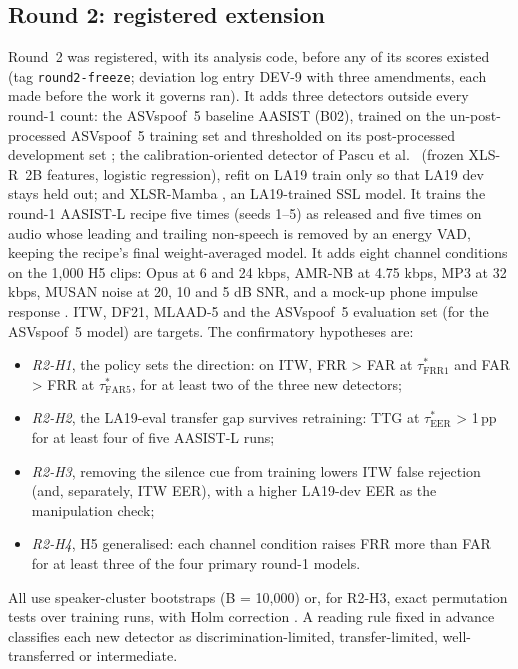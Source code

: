 \documentclass[journal]{IEEEtran}
\newcommand{\tauE}{\tau^{*}_{\mathrm{EER}}}
\newcommand{\tauF}[1]{\tau^{*}_{\mathrm{FRR}#1}}
\newcommand{\tauA}[1]{\tau^{*}_{\mathrm{FAR}#1}}
\begin{document}
\subsection{Round 2: registered extension}
Round~2 was registered, with its analysis code, before any of its scores existed (tag \texttt{round2-freeze}; deviation log
entry DEV-9 with three amendments, each made before the work it governs ran). It adds three detectors outside every round-1
count: the ASVspoof~5 baseline AASIST (B02), trained on the un-post-processed ASVspoof~5 training set and thresholded on its
post-processed development set \cite{wang25_asvspoof5_db}; the calibration-oriented detector of Pascu et
al.\ \cite{pascu24_calibrated} (frozen XLS-R~2B \cite{babu21_xlsr} features, logistic regression), refit on LA19 train only so that LA19 dev
stays held out; and XLSR-Mamba \cite{xiao25_xlsrmamba}, an LA19-trained SSL model. It trains the round-1
AASIST-L recipe five times (seeds 1--5) as released and five times on audio whose leading and trailing non-speech is
removed by an energy VAD, keeping the recipe's final weight-averaged model. It adds eight channel conditions on the 1,000
H5 clips: Opus at 6 and 24 kbps, AMR-NB at 4.75 kbps, MP3 at 32 kbps, MUSAN noise \cite{snyder15_musan} at 20, 10 and 5 dB SNR,
and a mock-up phone impulse response \cite{jeub09_air,ko17_rirs}. ITW, DF21, MLAAD-5 \cite{mlaad24} and the
ASVspoof~5 evaluation set (for the ASVspoof~5 model) are targets. The confirmatory hypotheses are:
\begin{itemize}
\item \emph{R2-H1}, the policy sets the direction: on ITW, FRR > FAR at \(\tauF{1}\) and FAR > FRR at \(\tauA{5}\), for at
least two of the three new detectors;
\item \emph{R2-H2}, the LA19-eval transfer gap survives retraining: TTG at \(\tauE\) > 1\,pp for at least four of five
AASIST-L runs;
\item \emph{R2-H3}, removing the silence cue from training lowers ITW false rejection (and, separately, ITW EER), with a
higher LA19-dev EER as the manipulation check;
\item \emph{R2-H4}, H5 generalised: each channel condition raises FRR more than FAR for at least three of the four primary
round-1 models.
\end{itemize}
All use speaker-cluster bootstraps (B = 10,000) or, for R2-H3, exact permutation tests over training runs, with Holm
correction \cite{holm79_holm}. A reading rule fixed in advance classifies each new detector as discrimination-limited,
transfer-limited, well-transferred or intermediate.
\end{document}
